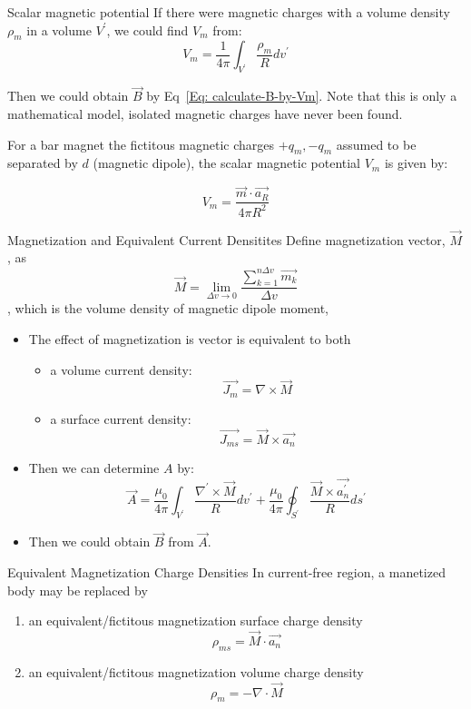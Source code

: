 \documentclass[xcolor={dvipsnames}]{beamer}
\begin{document}
\begin{frame}{Scalar magnetic potential}
If there were magnetic charges with a volume density $\rho_m$ in a volume $V^\prime$, we could find $V_m$ from:
$$
V_m = \frac{1}{4\pi} \int_{V^\prime} \frac{\rho_m}{R}dv^\prime
$$

Then we could obtain $\vec{B}$ by Eq~\ref{Eq: calculate-B-by-Vm}. Note that this is only a mathematical model, isolated magnetic charges have never been found.

For a bar magnet the fictitous magnetic charges $+q_m, -q_m$ assumed to be separated by $d$ (magnetic dipole), the scalar magnetic potential $V_m$ is given by:

$$
V_m = \frac{\vec{m}\cdot\vec{a_R}}{4\pi R^2}
$$
\end{frame}
\begin{frame}{Magnetization and Equivalent Current Densitites}
Define magnetization vector, $\vec{M}$, as
$$
\vec{M} = \lim_{\Delta v\to 0} \frac{\sum_{k=1}^{n\Delta v}\vec{m_k}}{\Delta v}
$$,
which is the volume density of magnetic dipole moment, 

\begin{itemize}
  \item The effect of magnetization is vector is equivalent to both 
  \begin{itemize}
    \item a volume current density:
    $$
    \vec{J_m} = \nabla\times\vec{M}
    $$
    \item a surface current density:
    $$
    \vec{J_{ms}} = \vec{M}\times\vec{a_n}
    $$
  \end{itemize}
  \item Then we can determine $A$ by:
  $$
  \vec{A} = \frac{\mu_0}{4\pi}\int_{V^\prime}\frac{\nabla^\prime\times\vec{M}}{R}dv^\prime + \frac{\mu_0}{4\pi}\oint_{S^\prime}\frac{\vec{M}\times\vec{a_n^\prime}}{R}ds^\prime
  $$
  \item Then we could obtain $\vec{B}$ from $\vec{A}$. 
\end{itemize}
\end{frame}
\begin{frame}{Equivalent Magnetization Charge Densities}
In current-free region, a manetized body may be replaced by 
\begin{enumerate}
  \item an equivalent/fictitous magnetization surface charge density 
  $$
  \rho_{ms} = \vec{M}\cdot\vec{a_n}
  $$ 
  \item an equivalent/fictitous magnetization volume charge density 
  $$
  \rho_m = -\nabla\cdot\vec{M}
  $$ 
\end{enumerate}
\end{frame}
\end{document}
